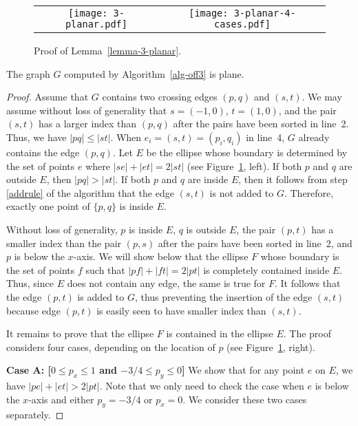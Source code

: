 \documentclass[pdftex,leqno,fleqn,12pts]{llncs}
\begin{document}
\begin{figure}
  \centering
\begin{tabular}{cc}
\texttt{[image: 3-planar.pdf]} &
\texttt{[image: 3-planar-4-cases.pdf]}
\end{tabular}
\caption{Proof of Lemma~\ref{lemma-3-planar}.}
\label{fig-3-planar}
\end{figure}


\begin{lemma}  \label{lemma-3-planar} 
The graph $G$ computed by Algorithm~\ref{alg-off3} is plane.
\end{lemma}
\begin{proof}
Assume that $G$ contains two crossing edges $(p,q)$ and $(s,t)$. We may 
assume without loss of generality that $s=(-1,0)$, $t=(1,0)$, and the
pair $(s,t)$ has a larger index than $(p,q)$ after the pairs have been 
sorted in line~2. Thus, we have $|pq| \leq |st|$. When
$e_i=(s,t)=(p_i,q_i)$ in line~4, $G$ already contains the edge $(p,q)$.
Let $E$ be the ellipse whose boundary is determined by the set of points $e$ where $|se|+|et|=2|st|$ (see
Figure~\ref{fig-3-planar}, left). If both $p$ and $q$ are outside $E$,
then $|pq|>|st|$. If both $p$ and $q$ are inside $E$, then it 
follows from step \ref{addrule} of the algorithm that the edge $(s,t)$ is not added to $G$. 
Therefore, exactly one point of $\{p,q\}$ is inside $E$.

Without loss of generality, $p$ is inside $E$, $q$ is outside $E$, 
the pair $(p,t)$ has a smaller index than the pair $(p,s)$ after 
the pairs have been sorted in line~2, and $p$ is below the $x$-axis. 
We will show below that the ellipse $F$ whose boundary is the set of 
points $f$ such that $|pf|+|ft|=2|pt|$ is completely contained inside 
$E$. Thus, since $E$ does not contain any edge, the same is true for 
$F$. It follows that the edge $(p,t)$ is added to $G$, thus preventing 
the insertion of the edge $(s,t)$ because edge $(p,t)$ is easily seen
to have smaller index than $(s,t)$.

It remains to prove that the ellipse $F$ is contained in the ellipse 
$E$. The proof considers four cases, depending on the location of $p$ 
(see Figure~\ref{fig-3-planar}, right).

\vspace{0.5em} 

\noindent 
\textbf{Case A: [$0\leq p_x \leq 1$ and $-3/4 \leq p_y \leq 0$]} We show that for any point $e$ on $E$, we have 
$|pe|+|et| > 2|pt|$. Note that we only need to check the case when 
$e$ is below the $x$-axis and either $p_y=-3/4$ or $p_x=0$. 
We consider these two cases separately.


\end{proof}
\end{document}
